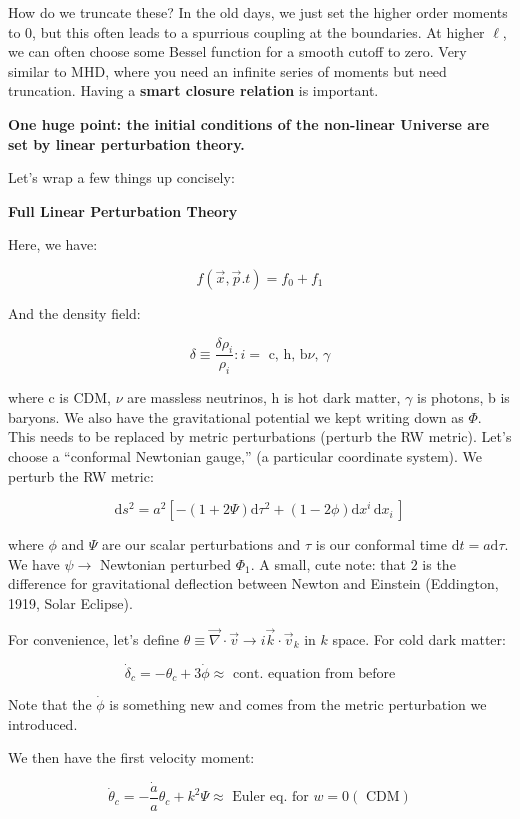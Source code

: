 \documentclass{article}
\newcommand{\be}{\begin{equation}}
\newcommand{\ee}{\end{equation}}
\begin{document}
How do we truncate these? In the old days, we just set the higher order moments to $0$, but this often leads to a spurrious coupling at the boundaries. At higher $\ell$, we can often choose some Bessel function for a smooth cutoff to zero. Very similar to MHD, where you need an infinite series of moments but need truncation. Having a \textbf{smart closure relation} is important. 

\textbf{One huge point: the initial conditions of the non-linear Universe are set by linear perturbation theory.}

Let's wrap a few things up concisely:

\noindent\textbf{Full Linear Perturbation Theory}

Here, we have:

\be
f(\vec{x},\vec{p}.t) = f_0 + f_1
\ee

And the density field: 

\be
\delta \equiv \frac{\delta \rho_i}{\rho_i}: i = \text{ c, h, b} \nu \text{, } \gamma 
\ee

where c is CDM, $\nu$ are massless neutrinos, h is hot dark matter, $\gamma$ is photons, b is baryons. 
We also have the gravitational potential we kept writing down as $\Phi$. This needs to be replaced by metric perturbations (perturb the RW metric). Let's choose a ``conformal Newtonian gauge,'' (a particular coordinate system). We perturb the RW metric:

\be
\mathrm{d}s^2 = a^2 \left[-\left(1+2\Psi\right)\mathrm{d}\tau^2 + \left(1-2\phi\right)\mathrm{d}x^{i}\,\mathrm{d}x_i\,\right]
\ee

where $\phi$ and $\Psi$ are our scalar perturbations and $\tau$ is our conformal time $\mathrm{d}t = a \mathrm{d}\tau$. We have $\psi \rightarrow$ Newtonian perturbed $\Phi_1$. A small, cute note: that $2$ is the difference for gravitational deflection between Newton and Einstein (Eddington, 1919, Solar Eclipse). 

For convenience, let's define $\theta \equiv \vec{\nabla} \cdot \vec{v} \rightarrow i \vec{k} \cdot \vec{v}_k$ in $k$ space. For cold dark matter:

\be
\dot{\delta}_c = -\theta_c + 3 \dot{\phi} \approx \text{ cont. equation from before} 
\ee

Note that the $\dot{\phi}$ is something new and comes from the metric perturbation we introduced. 

We then have the first velocity moment:

\be
\dot{\theta}_c = -\frac{\dot{a}}{a} \theta_c + k^2 \Psi \approx \text{ Euler eq. for } w = 0 (\text{ CDM})
\ee
\end{document}
